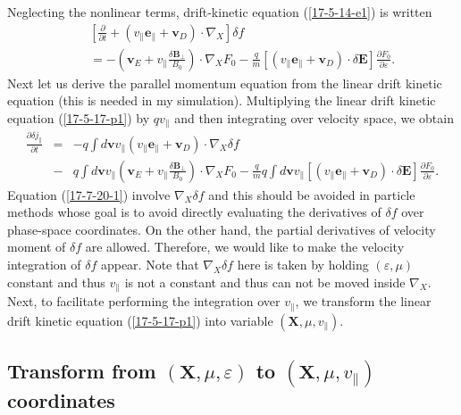 \documentclass{article}
\begin{document}
Neglecting the nonlinear terms, drift-kinetic equation (\ref{17-5-14-e1}) is
written
\begin{eqnarray}
  &  & \left[ \frac{\partial}{\partial t} + (v_{\parallel}
  \mathbf{e}_{\parallel} +\mathbf{v}_D) \cdot \nabla_X \right] \delta f
  \nonumber\\
  &  & = - \left( \mathbf{v}_E + v_{\parallel} \frac{\delta
  \mathbf{B}_{\perp}}{B_0} \right) \cdot \nabla_X F_0 - \frac{q}{m}
  [(v_{\parallel} \mathbf{e}_{\parallel} +\mathbf{v}_D) \cdot \delta
  \mathbf{E}] \frac{\partial F_0}{\partial \varepsilon} .  \label{17-5-17-p1}
\end{eqnarray}
Next let us derive the parallel momentum equation from the linear drift
kinetic equation (this is needed in my simulation). Multiplying the linear
drift kinetic equation (\ref{17-5-17-p1}) by $q v_{\parallel}$ and then
integrating over velocity space, we obtain
\begin{eqnarray}
  \frac{\partial \delta j_{\parallel}}{\partial t} & = & - q \int
  d\mathbf{v}v_{\parallel} (v_{\parallel} \mathbf{e}_{\parallel}
  +\mathbf{v}_D) \cdot \nabla_X \delta f \nonumber\\
  & - & q \int d\mathbf{v}v_{\parallel} \left( \mathbf{v}_E + v_{\parallel}
  \frac{\delta \mathbf{B}_{\perp}}{B_0} \right) \cdot \nabla_X F_0 -
  \frac{q}{m} q \int d\mathbf{v}v_{\parallel} [(v_{\parallel}
  \mathbf{e}_{\parallel} +\mathbf{v}_D) \cdot \delta \mathbf{E}]
  \frac{\partial F_0}{\partial \varepsilon} .  \label{17-7-20-1}
\end{eqnarray}
Equation (\ref{17-7-20-1}) involve $\nabla_X \delta f$ and this should be
avoided in particle methods whose goal is to avoid directly evaluating the
derivatives of $\delta f$ over phase-space coordinates. On the other hand, the
partial derivatives of velocity moment of $\delta f$ are allowed. Therefore,
we would like to make the velocity integration of $\delta f$ appear. Note that
$\nabla_X \delta f$ here is taken by holding $(\varepsilon, \mu)$ constant and
thus $v_{\parallel}$ is not a constant and thus can not be moved inside
$\nabla_X$. Next, to facilitate performing the integration over
$v_{\parallel}$, we transform the linear drift kinetic equation
(\ref{17-5-17-p1}) into variable $(\mathbf{X}, \mu, v_{\parallel})$.

\subsection{Transform from $(\mathbf{X}, \mu, \varepsilon)$ to $(\mathbf{X},
\mu, v_{\parallel})$ coordinates}\label{17-6-16-e1}
\end{document}
